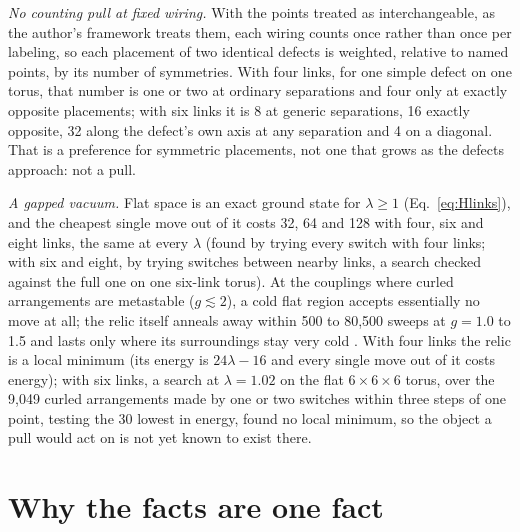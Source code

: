 \documentclass[pre,twocolumn,superscriptaddress,nofootinbib]{revtex4-2}
\begin{document}
\emph{No counting pull at fixed wiring.} With the points treated as interchangeable, as the author's framework treats
them, each wiring counts once rather than once per labeling, so each placement of two identical defects is weighted,
relative to named points, by its number of symmetries. With four links, for one simple
defect on one torus, that number is one or two at ordinary separations and four only at exactly opposite placements;
with six links it is 8 at generic separations, 16 exactly opposite, 32 along the defect's own axis at any separation
and 4 on a diagonal. That is a preference for symmetric placements, not one that grows as the defects approach: not a
pull.

\emph{A gapped vacuum.} Flat space is an exact ground state for $\lambda \ge 1$ (Eq.~\ref{eq:Hlinks}), and the cheapest
single move out of it costs 32, 64 and 128 with four, six and eight links, the same at every $\lambda$ (found by trying
every switch with four links; with six and eight, by trying switches between nearby links, a search checked against
the full one on one six-link torus). At the couplings where curled arrangements are metastable ($g \lesssim 2$), a
cold flat region accepts essentially no move at all; the relic itself anneals away within 500 to 80,500 sweeps at
$g = 1.0$ to 1.5 and lasts only where its surroundings stay very cold \cite{paper2}. With four links the relic is a
local minimum (its energy is $24\lambda - 16$ and every single move out of it costs energy); with six links, a search
at $\lambda = 1.02$ on the flat $6 \times 6 \times 6$ torus, over the 9,049 curled arrangements made by one or two
switches within three steps of one point, testing the 30 lowest in energy, found no local minimum, so the object a
pull would act on is not yet known to exist there.

\section{Why the facts are one fact}
\end{document}
